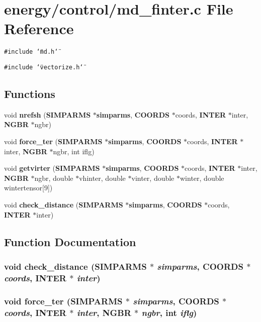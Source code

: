 \section{energy/control/md\_\-finter.c File Reference}
\label{md__finter_8c}
{\tt \#include \char`\"{}md.h\char`\"{}}\par
{\tt \#include \char`\"{}vectorize.h\char`\"{}}\par
\subsection*{Functions}
\begin{CompactItemize}
\item 
void {\bf nrefsh} ({\bf SIMPARMS} $\ast${\bf simparms}, {\bf COORDS} $\ast$coords, {\bf INTER} $\ast$inter, {\bf NGBR} $\ast$ngbr)
\item 
void {\bf force\_\-ter} ({\bf SIMPARMS} $\ast${\bf simparms}, {\bf COORDS} $\ast$coords, {\bf INTER} $\ast$inter, {\bf NGBR} $\ast$ngbr, int iflg)
\item 
void {\bf getvirter} ({\bf SIMPARMS} $\ast${\bf simparms}, {\bf COORDS} $\ast$coords, {\bf INTER} $\ast$inter, {\bf NGBR} $\ast$ngbr, double $\ast$vhinter, double $\ast$vinter, double $\ast$winter, double wintertensor[9])
\item 
void {\bf check\_\-distance} ({\bf SIMPARMS} $\ast${\bf simparms}, {\bf COORDS} $\ast$coords, {\bf INTER} $\ast$inter)
\end{CompactItemize}


\subsection{Function Documentation}
\subsubsection{\setlength{\rightskip}{0pt plus 5cm}void check\_\-distance ({\bf SIMPARMS} $\ast$ {\em simparms}, {\bf COORDS} $\ast$ {\em coords}, {\bf INTER} $\ast$ {\em inter})}\label{md__finter_8c_591c9c8999cce77a14804a16248878cf}


\subsubsection{\setlength{\rightskip}{0pt plus 5cm}void force\_\-ter ({\bf SIMPARMS} $\ast$ {\em simparms}, {\bf COORDS} $\ast$ {\em coords}, {\bf INTER} $\ast$ {\em inter}, {\bf NGBR} $\ast$ {\em ngbr}, int {\em iflg})}\label{md__finter_8c_4be8d1e18fae00ee1731563e754c5eb1}



